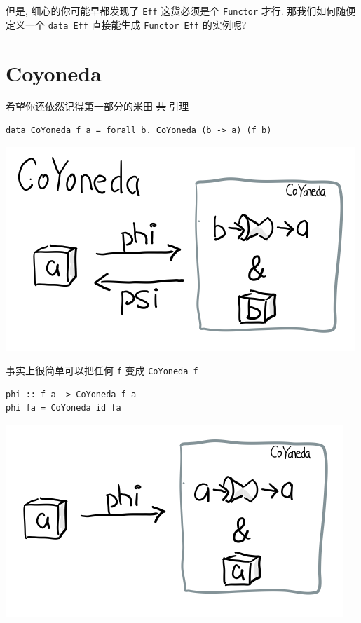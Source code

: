 \documentclass[11pt]{tufte-book}
\begin{document}
但是, 细心的你可能早都发现了 \texttt{Eff} 这货必须是个 \texttt{Functor} 才行. 那我们如何随便定义一个 \texttt{data Eff} 直接能生成 \texttt{Functor Eff} 的实例呢?

\section{Coyoneda}
\label{sec:orgd500d30}

希望你还依然记得第一部分的米田 \sout{共} 引理

\begin{verbatim}
data CoYoneda f a = forall b. CoYoneda (b -> a) (f b)
\end{verbatim}

\begin{center}
\includegraphics[width=.9\linewidth]{images/p3-CoYoneda.png}
\end{center}

事实上很简单可以把任何 \texttt{f} 变成 \texttt{CoYoneda f}

\begin{verbatim}
phi :: f a -> CoYoneda f a
phi fa = CoYoneda id fa
\end{verbatim}

\begin{center}
\includegraphics[width=.9\linewidth]{images/p3-CoYoneda-phi.png}
\end{center}
\end{document}
